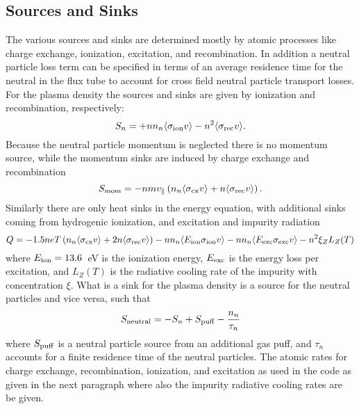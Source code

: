 \documentclass[amsmath,amssymb,a4]{revtex4}
\begin{document}
\subsection{Sources and Sinks}

The various sources and sinks are determined mostly by atomic processes like charge exchange, ionization, excitation, and recombination. In addition a neutral particle loss term can be specified in terms of an average residence time for the neutral in the flux tube to account for cross field neutral particle transport losses. For the plasma density the sources and sinks are given by ionization and recombination, respectively:
\begin{equation}\label{particle_source}
    S_n = + n n_n \langle\sigma_{\rm ion} v\rangle - n^2 \langle\sigma_{\rm rec} v\rangle.
\end{equation}
Because the neutral particle momentum is neglected there is no momentum source, while the momentum sinks are induced by charge exchange and recombination
\begin{equation}\label{momentum_source}
    S_{\rm mom} = - n m v_\parallel \left(n_n \langle\sigma_{\rm cx} v\rangle + n \langle\sigma_{\rm rec} v\rangle \right).
\end{equation}
Similarly there are only heat sinks in the energy equation, with additional sinks coming from hydrogenic ionization, and excitation and impurity radiation
\begin{equation}\label{energy_source}
    Q = - 1.5 n e T \left(n_n \langle\sigma_{\rm cx} v\rangle + 2 n \langle\sigma_{\rm rec} v\rangle \right) - n n_n \langle E_{\rm ion} \sigma_{\rm ion} v\rangle - n n_n \langle E_{\rm exc} \sigma_{\rm exc} v\rangle - n^2 \xi_Z L_Z(T)
\end{equation}
where $E_{\rm ion} = 13.6$~eV is the ionization energy, $E_{\rm exc}$ is the energy loss per excitation, and $L_Z(T)$ is the radiative cooling rate of the impurity with concentration $\xi$. What is a sink for the plasma density is a source for the neutral particles and vice versa, such that
\begin{equation}\label{neutral_source}
    S_{\rm neutral} = - S_n + S_{\rm puff} - {n_n \over \tau_n}
\end{equation}
where $S_{\rm puff}$ is a neutral particle source from an additional gas puff, and $\tau_n$ accounts for a finite residence time of the neutral particles. The atomic rates for charge exchange, recombination, ionization, and excitation as used in the code as given in the next paragraph where also the impurity radiative cooling rates are be given.
\end{document}
